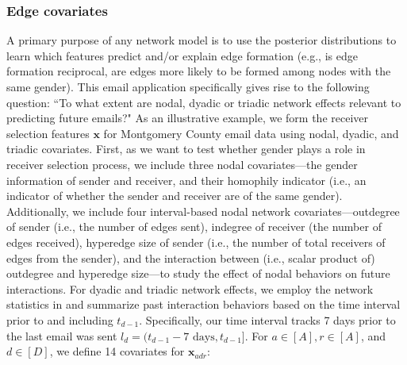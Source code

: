 \documentclass[ba]{imsart}
\numberwithin{equation}{section}
\theoremstyle{plain}
\begin{document}
	\subsubsection{Edge covariates}
	A primary purpose of any network model is to use the posterior distributions to learn which features predict and/or explain edge formation (e.g., is edge formation reciprocal, are edges more likely to be formed among nodes with the same gender). This email application specifically gives rise to the following question: ``To what extent are nodal, dyadic or triadic network effects relevant to predicting future emails?" As an illustrative example, we form the receiver selection features $\boldsymbol{x}$ for Montgomery County email data using nodal, dyadic, and triadic covariates. First, as we want to test whether gender plays a role in receiver selection process, we include three nodal covariates---the gender information of sender and receiver, and their homophily indicator (i.e., an indicator of whether the sender and receiver are of the same gender).  Additionally, we include four interval-based nodal network covariates---outdegree of sender (i.e., the number of edges sent), indegree of receiver (the number of edges received), hyperedge size of sender (i.e., the number of total receivers of edges from the sender), and the interaction between (i.e., scalar product of) outdegree and hyperedge size---to study the effect of nodal behaviors on future interactions. For dyadic and triadic network effects, we employ the network statistics in \cite{PerryWolfe2012} and summarize past interaction behaviors based on the time interval prior to and including $t_{d-1}$. Specifically, our time interval tracks 7 days prior to the last email was sent $l_d = (t_{d-1}-7\mbox{ days}, t_{d-1}]$. For $a \in [A], r \in [A]$, and $d \in [D]$, we define 14 covariates for $\boldsymbol{x}_{adr}$:
\end{document}
